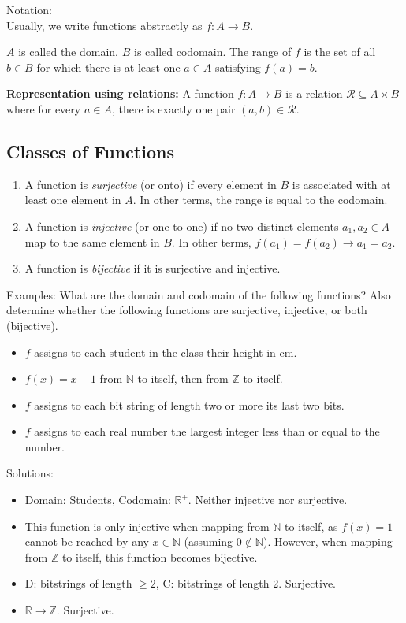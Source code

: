 \documentclass{article}
\begin{document}
    Notation:\\
    Usually, we write functions abstractly as $f: A \rightarrow B$.
    
    $A$ is called the domain. $B$ is called codomain. The range of $f$ is the set of all $b\in B$ for which there is at least one $a\in A$ satisfying $f(a)=b$. 
    
    \textbf{Representation using relations:} A function $f: A \rightarrow B$ is a relation $\mathcal{R} \subseteq A \times B$ where for every $a \in A$, there is exactly one pair $(a, b) \in \mathcal{R}$.
    
\subsection*{Classes of Functions}
    \begin{enumerate}
        \item A function is \textit{surjective} (or onto) if every element in $B$ is associated with at least one element in $A$. In other terms, the range is equal to the codomain.
        \item A function is \textit{injective} (or one-to-one) if no two distinct elements $a_1, a_2 \in A$ map to the same element in $B$. In other terms, $f(a_1) = f(a_2) \rightarrow a_1 = a_2$.
        \item A function is \textit{bijective} if it is surjective and injective.
    \end{enumerate}
    
    Examples:
    What are the domain and codomain of the following functions? Also determine whether the following functions are surjective, injective, or both (bijective).
    \begin{itemize}
        \item $f$ assigns to each student in the class their height in cm.
        \item $f(x) = x+1$ from $\mathbb{N}$ to itself, then from $\mathbb{Z}$ to itself.
        \item $f$ assigns to each bit string of length two or more its last two bits.
        \item $f$ assigns to each real number the largest integer less than or equal to the number.
    \end{itemize}
    
    Solutions:
    \begin{itemize}
        \item Domain: Students, Codomain: $\mathbb{R}^{+}$. Neither injective nor surjective.
        \item This function is only injective when mapping from $\mathbb{N}$ to itself, as $f(x) = 1$ cannot be reached by any $x \in \mathbb{N}$ (assuming $0 \notin \mathbb{N}$). However, when mapping from $\mathbb{Z}$ to itself, this function becomes bijective.
        \item D: bitstrings of length $\ge 2$, C: bitstrings of length 2. Surjective.
        \item $\mathbb{R} \rightarrow \mathbb{Z}$. Surjective.
    \end{itemize}
    
\end{document}

